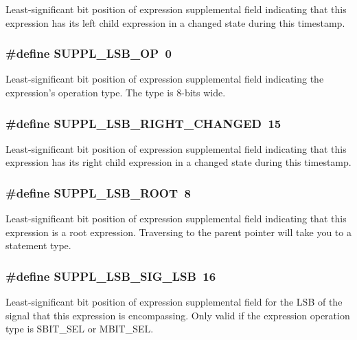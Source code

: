 Least-significant bit position of expression supplemental field indicating that this expression has its left child expression in a changed state during this timestamp. 
\subsubsection{\setlength{\rightskip}{0pt plus 5cm}\#define SUPPL\_\-LSB\_\-OP\ 0}\label{group__expr__suppl_a0}


Least-significant bit position of expression supplemental field indicating the expression's operation type. The type is 8-bits wide. 
\subsubsection{\setlength{\rightskip}{0pt plus 5cm}\#define SUPPL\_\-LSB\_\-RIGHT\_\-CHANGED\ 15}\label{group__expr__suppl_a8}


Least-significant bit position of expression supplemental field indicating that this expression has its right child expression in a changed state during this timestamp. 
\subsubsection{\setlength{\rightskip}{0pt plus 5cm}\#define SUPPL\_\-LSB\_\-ROOT\ 8}\label{group__expr__suppl_a1}


Least-significant bit position of expression supplemental field indicating that this expression is a root expression. Traversing to the parent pointer will take you to a statement type. 
\subsubsection{\setlength{\rightskip}{0pt plus 5cm}\#define SUPPL\_\-LSB\_\-SIG\_\-LSB\ 16}\label{group__expr__suppl_a9}


Least-significant bit position of expression supplemental field for the LSB of the signal that this expression is encompassing. Only valid if the expression operation type is SBIT\_\-SEL or MBIT\_\-SEL. 

